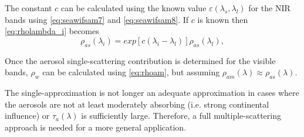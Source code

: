 The constant $c$ can be calculated using the known value $\varepsilon(\lambda_s,\lambda_l)$ for the NIR bands using \autoref{eq:seawifsam7} and \autoref{eq:seawifsam8}. If $c$ is known then \autoref{eq:rholambda_i} becomes
\begin{equation}\label{eq:rholambda_ifinal}
  \rho_{as}(\lambda_i) = exp[c(\lambda_i-\lambda_l)]\rho_{as}(\lambda_l),
\end{equation}

Once the aerosol single-scattering contribution is determined for the visible bands, $\rho_w$ can be calculated using \autoref{eq:rhoam}, but assuming $\rho_{am}(\lambda)\approx\rho_{as}(\lambda)$. 

The single-approximation is not longer an adequate approximation in cases where the aerosols are not at least moderately absorbing (i.e. strong continental influence) or $\tau_a(\lambda)$ is sufficiently large. Therefore, a full multiple-scattering approach is needed for a more general application.



